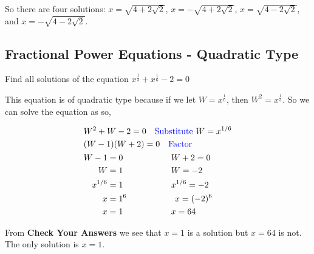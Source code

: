 So there are four solutions: $x=\sqrt{4+2\sqrt{2}}$, $x=-\sqrt{4+2\sqrt{2}}$, $x=\sqrt{4-2\sqrt{2}}$, and $x=-\sqrt{4-2\sqrt{2}}$.

\subsection{Fractional Power Equations - Quadratic Type}

Find all solutions of the equation $x^{\frac{1}{3}}+x^{\frac{1}{6}}-2=0$

This equation is of quadratic type because if we let $W=x^{\frac{1}{6}}$, then
$W^2=x^{\frac{1}{3}}$. So we can solve the equation as so,

\begin{align*}
    &W^2 + W - 2 = 0 \quad \text{\color{blue} Substitute } W = x^{1/6} \\
    &(W - 1)(W + 2) = 0 \quad \text{\color{blue} Factor} \\
    &\begin{aligned}
        W - 1 &= 0 \hspace{2cm}  W + 2= 0 \\
        W &= 1 \hspace{2cm}  W= -2 \\
        x^{1/6} &= 1 \hspace{2cm}  x^{1/6}= -2 \\	
        x &= 1^6 \hspace{2cm}  x= (-2)^6 \\
        x &= 1 \hspace{2cm}  x= 64 \\
    \end{aligned}
\end{align*}

From \textbf{Check Your Answers} we see that $x=1$ is a solution but $x=64$ is not. The only
solution is $x=1$.